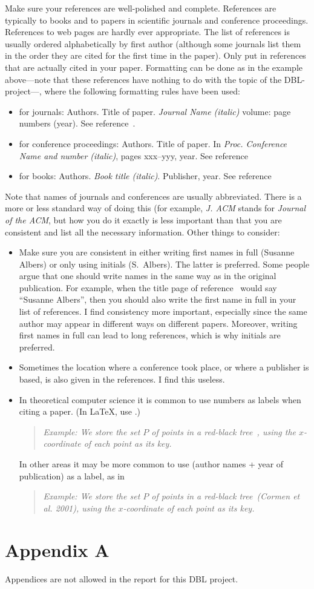 \documentclass[11pt]{article}
\newcommand{\example}[1]{\begin{quotation} {\sl \noindent Example: #1} \end{quotation}}
\begin{document}
Make sure your references are well-polished and complete.
References are typically to books and to papers in scientific
journals and conference proceedings. References to web pages are hardly
ever appropriate.
The list of references is usually ordered alphabetically by first author (although some journals
list them in the order they are cited for the first time in the paper).
Only put in references that are actually cited in your paper.
Formatting can be done as in the example above---note that these references have
nothing to do with the topic of the DBL-project---, where the following
formatting rules have been used:
\begin{itemize}
\item for journals:
      Authors. Title of paper. \emph{Journal Name (italic)} volume: page numbers (year).
      See reference~\cite{m-apca-83}.
\item for conference proceedings:
      Authors. Title of paper. In \emph{Proc. Conference Name and number (italic)}, pages xxx--yyy, year.
      See reference~\cite{a-raoa-02}
\item for books: Authors. \emph{Book title (italic)}. Publisher, year.
      See reference~\cite{clrs-ia-01}
\end{itemize}
Note that names of journals and conferences are usually abbreviated. There is a more
or less standard way of doing this (for example, \emph{J. ACM} stands for \emph{Journal of the ACM},
but how you do it exactly is less important than that
you are consistent and list all the necessary information. Other things to consider:
\begin{itemize}
\item Make sure you are consistent in either writing first names in full (Susanne Albers)
     or only using initials (S.~Albers). The latter is preferred.
     Some people argue that one should write names in the same way as in
     the original publication. For example, when the title page of reference~\cite{a-raoa-02}
     would say ``Susanne Albers'', then you should also write the first name in full in
     your list of references. I find consistency more important, especially since
     the same author may appear in different ways on different papers. Moreover,
     writing first names in full can lead to long references, which is why
     initials are preferred.
\item Sometimes the location where a conference took place, or where a publisher is based,
      is also given in the references. I find this useless.
\item In theoretical computer science it is common to use numbers as labels when citing a paper.
      (In \LaTeX, use \verb##.)
      \example{We store the set $P$ of points in a red-black tree~\cite{clrs-ia-01},
         using the $x$-coordinate of each point as its key.}
      In other areas it may be more
      common to use (author names + year of publication) as a label, as in
      \example{We store the set $P$ of points in a red-black tree~(Cormen et al. 2001),
         using the $x$-coordinate of each point as its key.}

\end{itemize}

\section*{Appendix A}
Appendices are not allowed in the report for this DBL project.
\end{document}
